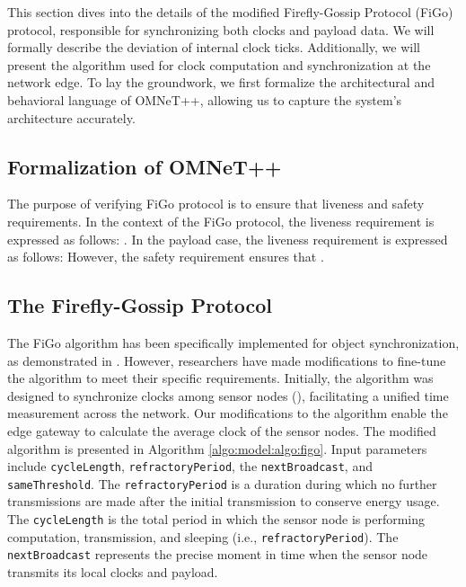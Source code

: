 This section dives into the details of the modified Firefly-Gossip Protocol (FiGo)  protocol, responsible for synchronizing both clocks and payload data. We will formally describe the deviation of internal clock ticks. Additionally, we will present the algorithm used for clock computation and synchronization at the network edge. To lay the groundwork, we first formalize the architectural and behavioral language of OMNeT++, allowing us to capture the system's architecture accurately.

\subsection{Formalization of OMNeT++}


The purpose of verifying FiGo protocol is to ensure that liveness and safety requirements. In the context of the FiGo protocol, the liveness requirement is expressed as follows: . In the payload case, the liveness requirement is expressed as follows:  However, the safety requirement ensures that .

\subsection{The Firefly-Gossip Protocol}

The FiGo algorithm has been specifically implemented for object synchronization, as demonstrated in \cite{WEBSTER2020101183, WebsterBDFM18, Oxford2020}. However, researchers have made modifications to fine-tune the algorithm to meet their specific requirements. Initially, the algorithm was designed to synchronize clocks among sensor nodes (), facilitating a unified time measurement across the network. Our modifications to the algorithm enable the edge gateway to calculate the average clock of the sensor nodes. The modified algorithm is presented in Algorithm \ref{algo:model:algo:figo}. Input parameters include \texttt{cycleLength}, \texttt{refractoryPeriod}, the \texttt{nextBroadcast}, and \texttt{sameThreshold}. The \texttt{refractoryPeriod} is a duration during which no further transmissions are made after the initial transmission to conserve energy usage. The \texttt{cycleLength} is the total period in which the sensor node is performing computation, transmission, and sleeping (i.e.,  \texttt{refractoryPeriod}). The \texttt{nextBroadcast} represents the precise moment in time when the sensor node transmits its local clocks and payload.

